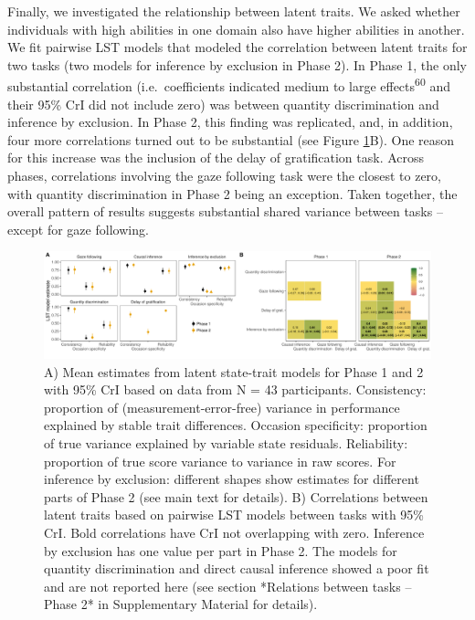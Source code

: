 \documentclass[
  man,floatsintext]{apa6}
\begin{document}
Finally, we investigated the relationship between latent traits. We asked whether individuals with high abilities in one domain also have higher abilities in another. We fit pairwise LST models that modeled the correlation between latent traits for two tasks (two models for inference by exclusion in Phase 2). In Phase 1, the only substantial correlation (i.e.~coefficients indicated medium to large effects\textsuperscript{60} and their 95\% CrI did not include zero) was between quantity discrimination and inference by exclusion. In Phase 2, this finding was replicated, and, in addition, four more correlations turned out to be substantial (see Figure \ref{fig:lstmplot}B). One reason for this increase was the inclusion of the delay of gratification task. Across phases, correlations involving the gaze following task were the closest to zero, with quantity discrimination in Phase 2 being an exception. Taken together, the overall pattern of results suggests substantial shared variance between tasks -- except for gaze following.

\begin{figure}
\includegraphics[width=1\linewidth]{./figures/structure} \caption{A) Mean estimates from latent state-trait models for Phase 1 and 2 with 95\% CrI based on data from N = 43 participants. Consistency: proportion of (measurement-error-free) variance in performance explained by stable trait differences. Occasion specificity: proportion of true variance explained by variable state residuals. Reliability: proportion of true score variance to variance in raw scores. For inference by exclusion: different shapes show estimates for different parts of Phase 2 (see main text for details). B) Correlations between latent traits based on pairwise LST models between tasks with 95\% CrI. Bold correlations have CrI not overlapping with zero. Inference by exclusion has one value per part in Phase 2. The models for quantity discrimination and direct causal inference showed a poor fit and are not reported here (see section *Relations between tasks -- Phase 2* in Supplementary Material for details).}\label{fig:lstmplot}
\end{figure}
\end{document}

